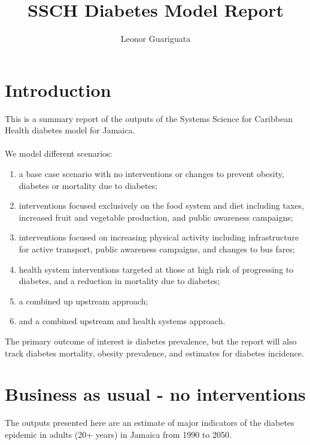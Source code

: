 \documentclass{article}
\begin{document}


\newpage
\title{SSCH Diabetes Model Report}
\author{Leonor Guariguata}
\maketitle

\section{Introduction}
This is a summary report of the outputs of the Systems Science for Caribbean Health diabetes model for Jamaica. 
\\
\\
We model  different scenarios:

\begin{enumerate}
  \item a base case scenario with no interventions or changes to prevent obesity, diabetes or mortality due to diabetes;
  \item interventions focused exclusively on the food system and diet including taxes, increased fruit and vegetable production, and public awareness campaigns;
  \item interventions focused on increasing physical activity including infrastructure for active transport, public awareness campaigns, and changes to bus fares;
  \item health system interventions targeted at those at high risk of progressing to diabetes, and a reduction in mortality due to diabetes;
  \item a combined up upstream approach;
  \item and a combined upstream and health systems approach.
\end{enumerate}

The primary outcome of interest is diabetes prevalence, but the report will also track diabetes mortality, obesity prevalence, and estimates for diabetes incidence.

\newpage
\section{Business as usual - no interventions}
The outputs presented here are an estimate of major indicators of the diabetes epidemic in adults (20+ years) in Jamaica from 1990 to 2050.
\end{document}

